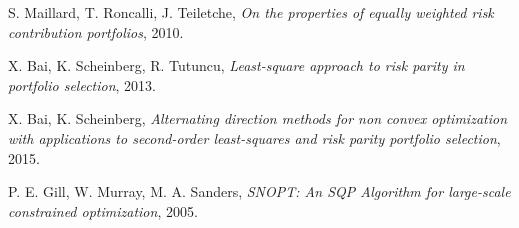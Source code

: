 S. Maillard, T. Roncalli, J. Teiletche,
\emph{On the properties of equally weighted risk contribution portfolios}, 
2010.

  X. Bai, K. Scheinberg, R. Tutuncu,
  \emph{Least-square approach to risk parity in portfolio selection},
  2013.   
  
  	X. Bai, K. Scheinberg,
  	\emph{Alternating direction methods for non convex
  	optimization with applications to second-order
 	least-squares and risk parity portfolio selection},
  	2015.

	P. E. Gill, W. Murray, M. A. Sanders,
	\emph{SNOPT: An SQP Algorithm for large-scale constrained optimization}, 
	2005.
